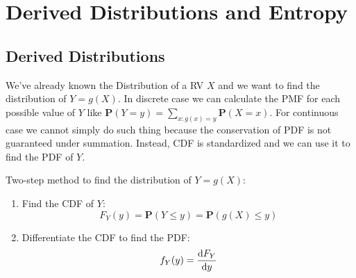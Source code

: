\chapter{Derived Distributions and Entropy}

\section{Derived Distributions}
\label{sec:derived-distributions}
We've already known the Distribution of a RV $X$ and we want to find the distribution of $Y = g(X)$. In discrete case we can calculate the PMF for each possible value of $Y$ like $\mathbf{P}(Y = y) = \sum_{x: g(x) = y} \mathbf{P}(X = x)$. For continuous case we cannot simply do such thing because the conservation of PDF is not guaranteed under summation. Instead, CDF is standardized and we can use it to find the PDF of $Y$.
\begin{theorem}
    Two-step method to find the distribution of $Y = g(X)$:
    \begin{enumerate}
        \item Find the CDF of $Y$:
        \begin{equation}
            F_{Y}(y) = \mathbf{P}(Y \leq y) = \mathbf{P}(g(X) \leq y)
        \end{equation}
        \item Differentiate the CDF to find the PDF:
        \begin{equation}
            f_{Y}(y) = \dv{F_{Y}}{y}
        \end{equation}
    \end{enumerate}
\end{theorem}

